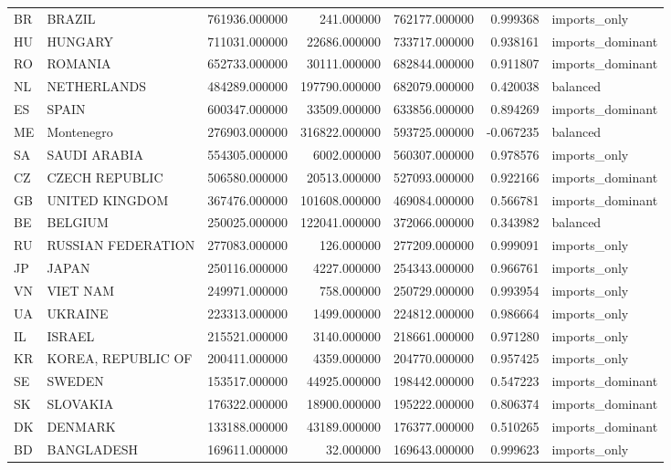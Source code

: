 \begin{tabular}{llrrrrl}
BR & BRAZIL & 761936.000000 & 241.000000 & 762177.000000 & 0.999368 & imports\_only \\
HU & HUNGARY & 711031.000000 & 22686.000000 & 733717.000000 & 0.938161 & imports\_dominant \\
RO & ROMANIA & 652733.000000 & 30111.000000 & 682844.000000 & 0.911807 & imports\_dominant \\
NL & NETHERLANDS & 484289.000000 & 197790.000000 & 682079.000000 & 0.420038 & balanced \\
ES & SPAIN & 600347.000000 & 33509.000000 & 633856.000000 & 0.894269 & imports\_dominant \\
ME & Montenegro & 276903.000000 & 316822.000000 & 593725.000000 & -0.067235 & balanced \\
SA & SAUDI ARABIA & 554305.000000 & 6002.000000 & 560307.000000 & 0.978576 & imports\_only \\
CZ & CZECH REPUBLIC & 506580.000000 & 20513.000000 & 527093.000000 & 0.922166 & imports\_dominant \\
GB & UNITED KINGDOM & 367476.000000 & 101608.000000 & 469084.000000 & 0.566781 & imports\_dominant \\
BE & BELGIUM & 250025.000000 & 122041.000000 & 372066.000000 & 0.343982 & balanced \\
RU & RUSSIAN FEDERATION & 277083.000000 & 126.000000 & 277209.000000 & 0.999091 & imports\_only \\
JP & JAPAN & 250116.000000 & 4227.000000 & 254343.000000 & 0.966761 & imports\_only \\
VN & VIET NAM & 249971.000000 & 758.000000 & 250729.000000 & 0.993954 & imports\_only \\
UA & UKRAINE & 223313.000000 & 1499.000000 & 224812.000000 & 0.986664 & imports\_only \\
IL & ISRAEL & 215521.000000 & 3140.000000 & 218661.000000 & 0.971280 & imports\_only \\
KR & KOREA, REPUBLIC OF & 200411.000000 & 4359.000000 & 204770.000000 & 0.957425 & imports\_only \\
SE & SWEDEN & 153517.000000 & 44925.000000 & 198442.000000 & 0.547223 & imports\_dominant \\
SK & SLOVAKIA & 176322.000000 & 18900.000000 & 195222.000000 & 0.806374 & imports\_dominant \\
DK & DENMARK & 133188.000000 & 43189.000000 & 176377.000000 & 0.510265 & imports\_dominant \\
BD & BANGLADESH & 169611.000000 & 32.000000 & 169643.000000 & 0.999623 & imports\_only \\

\end{tabular}
